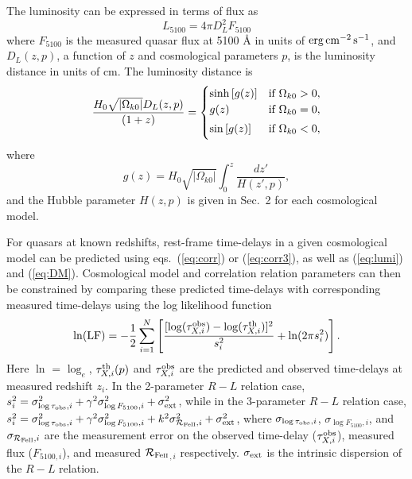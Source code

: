 \documentclass[a4paper,fleqn,usenatbib]{mnras}
\newcommand{\rfe}{${\cal R}_{\rm{Fe\textsc{ii}}}$}
\begin{document}
The luminosity can be expressed in terms of flux as
\begin{equation}
\label{eq:lumi}
     L_{5100} = 4\pi D^{2}_L F_{5100}
\end{equation}
where $F_{5100}$ is the measured quasar flux at 5100 {\AA} in units of ${\rm erg\,cm^{-2}\,s^{-1}}$, and $D_L(z, p)$, a function of $z$ and cosmological parameters $p$, is the luminosity distance in units of cm. The luminosity distance is 
\begin{equation}
\label{eq:DM}
  \frac{H_0\sqrt{\left|\Omega_{k0}\right|}D_L(z, p)}{(1+z)} = 
    \begin{cases}
    {\rm sinh}\left[g(z)\right] & \text{if}\ \Omega_{k0} > 0, \\
    \vspace{1mm}
    g(z) & \text{if}\ \Omega_{k0} = 0,\\
    \vspace{1mm}
    {\rm sin}\left[g(z)\right] & \text{if}\ \Omega_{k0} < 0,
    \end{cases}   
\end{equation}
where
\begin{equation}
\label{eq:fun}
   g(z) = H_0\sqrt{\left|\Omega_{k0}\right|}\int^z_0 \frac{dz'}{H(z', p)},
\end{equation}
and the Hubble parameter $H(z, p)$ is given in Sec.\ 2 for each cosmological model.

For quasars at known redshifts, rest-frame time-delays in a given cosmological model can be predicted using eqs.\ (\ref{eq:corr}) or (\ref{eq:corr3}), as well as (\ref{eq:lumi}) and (\ref{eq:DM}). Cosmological model and correlation relation parameters can then be constrained by comparing these predicted time-delays with corresponding measured time-delays using the log likelihood function \citep{Dago2005}
\begin{equation}
\label{eq:chi2}
    \ln({\rm LF}) = -\frac{1}{2}\sum^{N}_{i = 1} \left[\frac{[\log(\tau^{\rm obs}_{X,i}) - \log(\tau^{\rm th}_{X,i})]^2}{s^2_i} + \ln(2\pi s^2_i)\right].
\end{equation}
Here $\ln$ = $\log_e$, $\tau^{\rm th}_{X,i}(p)$ and $\tau^{\rm obs}_{X,i}$ are the predicted and observed time-delays at measured redshift $z_i$. In the 2-parameter $R-L$ relation case,  $s^2_i = \sigma^2_{\log{\tau_{\rm obs},i}} + \gamma^2 \sigma^2_{\log{F_{5100},i}} + \sigma_{\rm ext}^2$,  while in the 3-parameter $R-L$ relation case,  $s^2_i = \sigma^2_{\log{\tau_{\rm obs},i}} + \gamma^2 \sigma^2_{\log{F_{5100},i}} + k^2 \sigma^2_{{\cal R}_{\text{Fe{\sc II}}},i} + \sigma_{\rm ext}^2$, where $\sigma_{\log{\tau_{\rm obs},i}}$, $\sigma_{\log{F_{5100},i}}$, and $\sigma_{{\cal R}_{\text{Fe{\sc II}}},i}$ are the measurement error on the observed time-delay ($\tau^{\rm obs}_{X,i}$), measured flux ($F_{5100,i}$), and measured \rfe$_{,i}$ respectively. $\sigma_{\rm ext}$ is the intrinsic dispersion of the $R-L$ relation.
\end{document}
